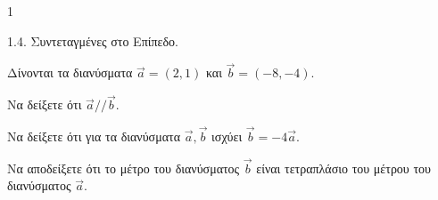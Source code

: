 \begin{ylh}{1}
    \item 1.4. Συντεταγμένες στο Επίπεδο.
\end{ylh}
Δίνονται τα διανύσματα $\vec{a} = (2, 1)$ και $\vec{b} = (-8, -4)$.
\begin{alist}
\item Να δείξετε ότι $\vec{a} // \vec{b}$. 
\item Να δείξετε ότι για τα διανύσματα $\vec{a}, \vec{b}$ ισχύει $\vec{b} = -4\vec{a}$. 
\item Να αποδείξετε ότι το μέτρο του διανύσματος $\vec{b}$ είναι τετραπλάσιο του μέτρου του διανύσματος $\vec{a}$. 
\end{alist}